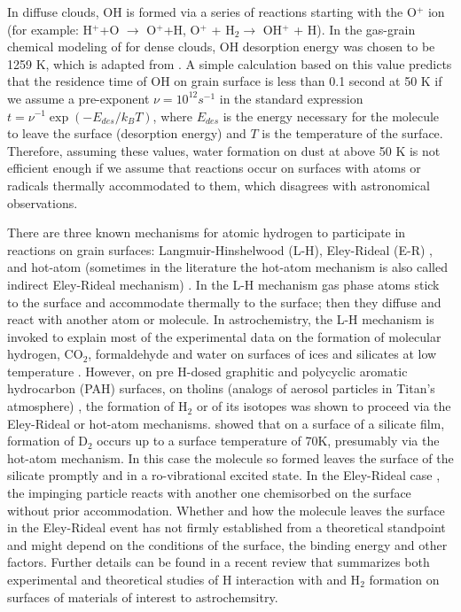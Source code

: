 \documentclass[iop]{emulateapj}
\begin{document}
In diffuse clouds, OH is formed via a series of reactions starting with the O$^+$ ion (for example:  H$^+$+O $\rightarrow$ O$^+$+H, O$^+$ + H$_2 \rightarrow$ OH$^+$ + H). In the gas-grain chemical modeling of \citet{Hasegawa1992} for dense clouds, OH desorption energy was chosen to be 1259 K, which is adapted from \citet{Allen1977}. A simple calculation based on this value predicts that the residence time of OH on grain surface is less than 0.1 second at 50 K if we assume a pre-exponent $\nu=10^{12} s^{-1}$ in the standard expression $t=\nu^{-1}\exp(-E_{des}/k_BT)$, where $E_{des}$ is the energy necessary for the molecule to leave the surface (desorption energy) and $T$ is the temperature of the surface. Therefore, assuming these values, water formation on dust at above 50 K is not efficient enough if we assume that reactions occur on surfaces with atoms or radicals thermally accommodated to them, which disagrees with astronomical observations. 

There are three known mechanisms for atomic hydrogen to participate in reactions on grain surfaces: Langmuir-Hinshelwood (L-H), Eley-Rideal (E-R) , and hot-atom  (sometimes in the literature the hot-atom mechanism is also called indirect Eley-Rideal mechanism) \citep{Kolasinski2008}. In the L-H mechanism gas phase atoms stick to the surface and accommodate thermally to the surface; then they diffuse and react with another atom or molecule. In astrochemistry, the L-H mechanism is invoked to explain most of the experimental data on the formation of molecular hydrogen, CO$_2$, formaldehyde and water on surfaces of ices and silicates at low temperature \citep{Vidali2013b}. However, on pre H-dosed graphitic and polycyclic aromatic hydrocarbon (PAH) surfaces\citep{Hornekaer2006,Baouche2006,Baouche2009,Mennella2008,Mennella2012}, on tholins (analogs of aerosol particles in Titan's atmosphere) \citep{Sekine2008},  the formation of H$_2$ or of its isotopes was shown to proceed via the Eley-Rideal or hot-atom mechanisms. \citet{lemaire2010} showed that on a surface of a silicate film, formation of D$_2$ occurs up to a surface temperature of 70K, presumably via the hot-atom mechanism. In this case the molecule so formed leaves the surface of the silicate promptly and in a ro-vibrational excited state. 
In the Eley-Rideal case \citep{Harris1981}, the impinging particle reacts with another one chemisorbed on the surface without prior accommodation. Whether and how the molecule leaves the surface in the Eley-Rideal event has not firmly established from a theoretical standpoint and  might depend on the conditions of the surface, the binding energy and other factors. Further details can be found in a  recent review \citep{Vidali2013c} that summarizes both experimental and theoretical studies of H interaction with and H$_2$ formation on surfaces of materials of interest to astrochemsitry. 
\end{document}

